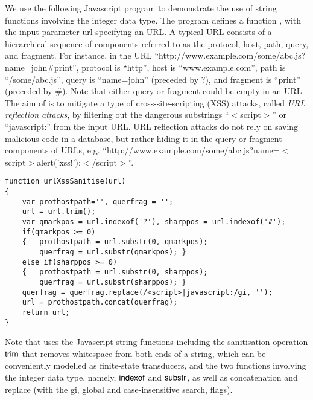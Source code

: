 
\begin{example}
We use the following Javascript program to demonstrate the use of string functions involving the integer data type.
The program defines a function {\urlxsssanitise}, with the input parameter url specifying an URL. A typical URL consists of a hierarchical sequence of components referred to as the protocol, host, path, query, and fragment. For instance, in the URL ``http://www.example.com/some/abc.js?name=john$\#$print'', protocol is ``http'', host is ``www.example.com'', path is ``/some/abc.js'', query is ``name=john'' (preceded by $?$), and fragment is ``print'' (preceded by $\#$). Note that either query or fragment could be empty in an URL. The aim of {\urlxsssanitise} is to mitigate a type of cross-site-scripting (XSS) attacks, called \emph{URL reflection attacks}, by filtering out the dangerous substrings ``$<$script$>$'' or ``javascript:'' from the input URL. URL reflection attacks  do not rely on saving malicious code in a database, but rather hiding it in the query or fragment components of URLs, e.g. ``http://www.example.com/some/abc.js?name=$<$script$>$alert('xss!');$<$/script$>$''.
{\small
\begin{verbatim}
function urlXssSanitise(url)
{
    var prothostpath='', querfrag = '';
    url = url.trim();
    var qmarkpos = url.indexof('?'), sharppos = url.indexof('#');
    if(qmarkpos >= 0) 
    {   prothostpath = url.substr(0, qmarkpos);
        querfrag = url.substr(qmarkpos); }
    else if(sharppos >= 0)
    {   prothostpath = url.substr(0, sharppos);
        querfrag = url.substr(sharppos); }
    querfrag = querfrag.replace(/<script>|javascript:/gi, '');
    url = prothostpath.concat(querfrag);
    return url;
}
\end{verbatim}
}

Note that {\urlxsssanitise} uses the Javascript string functions including the sanitisation operation $\sf trim$ that removes whitespace from both ends of a string, which can be conveniently modelled as finite-state transducers, and the two functions involving the integer data type, namely, $\sf indexof$ and $\sf substr$, as well as concatenation and replace (with the gi, global and case-insensitive search, flags).



\end{example}
